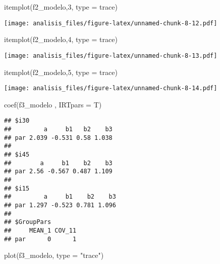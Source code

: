 \documentclass[
]{article}
\newenvironment{Shaded}{\begin{snugshade}}{\end{snugshade}}
\newcommand{\AttributeTok}[1]{\textcolor[rgb]{0.77,0.63,0.00}{#1}}
\newcommand{\DecValTok}[1]{\textcolor[rgb]{0.00,0.00,0.81}{#1}}
\newcommand{\FunctionTok}[1]{\textcolor[rgb]{0.00,0.00,0.00}{#1}}
\newcommand{\NormalTok}[1]{#1}
\newcommand{\StringTok}[1]{\textcolor[rgb]{0.31,0.60,0.02}{#1}}
\begin{document}
\begin{Shaded}
\begin{Highlighting}[]
\FunctionTok{itemplot}\NormalTok{(f2\_modelo,}\DecValTok{3}\NormalTok{, }\AttributeTok{type =} \StringTok{\textquotesingle{}trace\textquotesingle{}}\NormalTok{)}
\end{Highlighting}
\end{Shaded}

\texttt{[image: analisis\_files/figure-latex/unnamed-chunk-8-12.pdf]}

\begin{Shaded}
\begin{Highlighting}[]
\FunctionTok{itemplot}\NormalTok{(f2\_modelo,}\DecValTok{4}\NormalTok{, }\AttributeTok{type =} \StringTok{\textquotesingle{}trace\textquotesingle{}}\NormalTok{)}
\end{Highlighting}
\end{Shaded}

\texttt{[image: analisis\_files/figure-latex/unnamed-chunk-8-13.pdf]}

\begin{Shaded}
\begin{Highlighting}[]
\FunctionTok{itemplot}\NormalTok{(f2\_modelo,}\DecValTok{5}\NormalTok{, }\AttributeTok{type =} \StringTok{\textquotesingle{}trace\textquotesingle{}}\NormalTok{)}
\end{Highlighting}
\end{Shaded}

\texttt{[image: analisis\_files/figure-latex/unnamed-chunk-8-14.pdf]}

\begin{Shaded}
\begin{Highlighting}[]
\FunctionTok{coef}\NormalTok{(f3\_modelo , }\AttributeTok{IRTpars =}\NormalTok{ T)}
\end{Highlighting}
\end{Shaded}

\begin{verbatim}
## $i30
##         a     b1   b2    b3
## par 2.039 -0.531 0.58 1.038
## 
## $i45
##        a     b1    b2    b3
## par 2.56 -0.567 0.487 1.109
## 
## $i15
##         a     b1    b2    b3
## par 1.297 -0.523 0.781 1.096
## 
## $GroupPars
##     MEAN_1 COV_11
## par      0      1
\end{verbatim}

\begin{Shaded}
\begin{Highlighting}[]
\FunctionTok{plot}\NormalTok{(f3\_modelo,  }\AttributeTok{type =} \StringTok{"trace"}\NormalTok{)}
\end{Highlighting}
\end{Shaded}
\end{document}
